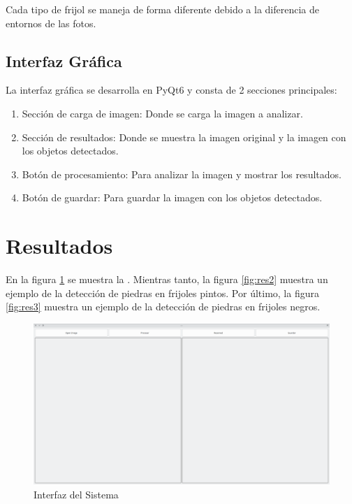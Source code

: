 \documentclass[conference]{IEEEtran}
\begin{document}
    Cada tipo de frijol se maneja de forma diferente debido a la diferencia de entornos de las fotos. 

    \subsection{Interfaz Gráfica}
    La interfaz gráfica se desarrolla en PyQt6\cite{pyqt6} y consta de 2 secciones principales:
    \begin{enumerate}
        \item Sección de carga de imagen: Donde se carga la imagen a analizar.
        \item Sección de resultados: Donde se muestra la imagen original y la imagen con los objetos detectados.
        \item Botón de procesamiento: Para analizar la imagen y mostrar los resultados.
        \item Botón de guardar: Para guardar la imagen con los objetos detectados.
    \end{enumerate}

\section{Resultados}
    En la figura \ref{fig:res1} se muestra la . Mientras tanto, la figura \ref{fig:res2} muestra un ejemplo de la detección de piedras en frijoles pintos. Por último, la figura \ref{fig:res3} muestra un ejemplo de la detección de piedras en frijoles negros.

    \begin{figure}[H]
        \centering
        \includegraphics[width=\breite\linewidth]{images/UI.png}
        \caption{Interfaz del Sistema}
        \label{fig:res1}
    \end{figure}
\end{document}
